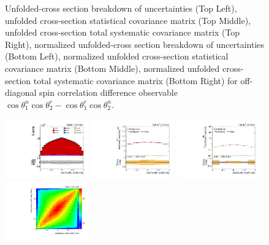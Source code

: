 \begin{figure}[htb]
\begin{center}
\caption{Unfolded-cross section breakdown of uncertainties (Top Left), unfolded cross-section statistical covariance matrix (Top Middle), unfolded cross-section total systematic covariance matrix (Top Right), normalized unfolded-cross section breakdown of uncertainties (Bottom Left), normalized unfolded cross-section statistical covariance matrix (Bottom Middle), normalized unfolded cross-section total systematic covariance matrix (Bottom Right) for off-diagonal spin correlation difference observable $\cos\theta_{1}^{n}\cos\theta_{2}^{r}-\cos\theta_{1}^{r}\cos\theta_{2}^{n}$.}
\label{fig:c_Mnr_uncertainties}
\end{center}
\end{figure}
\clearpage
\begin{figure}[htb]
\begin{center}
 \includegraphics[width=0.32\textwidth]{fig_fullRun2UL/controlplots/combined/Hyp_LLBarCPnk.pdf}
 \includegraphics[width=0.32\textwidth]{fig_fullRun2UL/unfolding/combined/UnfoldedResults_c_Pnk.pdf}
 \includegraphics[width=0.32\textwidth]{fig_fullRun2UL/unfolding/combined/UnfoldedResultsNorm_c_Pnk.pdf} \\
 \includegraphics[width=0.32\textwidth]{fig_fullRun2UL/unfolding/combined/ResponseMatrix_c_Pnk.pdf}

\end{center}
\end{figure}
